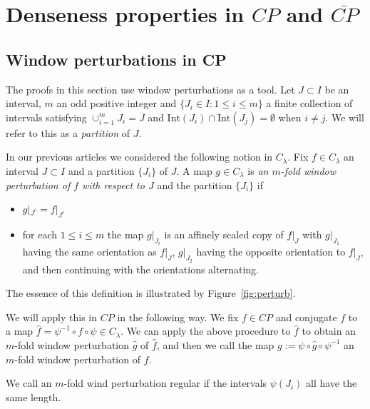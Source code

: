 \documentclass[12pt, a4paper]{amsart}
\def\le{\leqslant}
\newcommand{\?}{{\bf ???}}
\def\Int{\mathrm{Int}}
\begin{document}
\section{Denseness properties in $CP$ and $\overline{CP}$}\label{sec:densness}


\subsection{Window perturbations in CP}\label{sec-win-pert}\label{subsec:windowperturbations} The proofs in this section use window perturbations as a tool.
Let $J\subset I$ be an interval, $m$ an odd positive integer and $\{J_i \in I: 1 \le i \le m \}$ a finite collection of intervals satisfying $\cup^{m}_{i=1} J_i = J$ and $\Int(J_i) \cap \Int(J_j) = \emptyset $ when $i \ne j$. We will refer to this as a {\it partition} of $J$.
 
In our previous articles we considered the following notion in $C_{\lambda}$. Fix $f \in C_{\lambda}$
 an interval $J \subset I$ and a partition $\{J_i\}$ of $J$.
 A map $g \in C_{\lambda}$ is {\it an $m$-fold window perturbation of $f$ with respect to $J$} and the partition $\{J_i\}$ if
 \begin{itemize}
     \item $g|_{J^c} = f|_{J^c}$ 
     \item for each $1 \le i \le m$ the map $g|_{J_i}$ is an affinely scaled copy of $f|_{J}$  with  $g|_{J_1}$ having the same orientation as $f|_J$, $g|_{J_2}$ having the opposite orientation to $f|_{J}$, and then continuing with the orientations alternating.
 \end{itemize}
 
The essence of this definition is illustrated by Figure~\ref{fig:perturb}.

We will apply this in $CP$ in the following way.  We fix $f \in CP$
and conjugate $f$ to a map $\hat{f} = \psi^{-1} \circ f \circ \psi \in C_{\lambda}$.  We can apply the above procedure to $\hat{f}$ to obtain an $m$-fold window perturbation $\hat{g}$ of $\hat{f}$, and then we call the map $g := \psi \circ \hat{g} \circ \psi^{-1}$ an $m$-fold window perturbation of $f$.


We call an $m$-fold wind perturbation regular
if the intervals $\psi(J_i)$ all have the same length.
 
\end{document}
